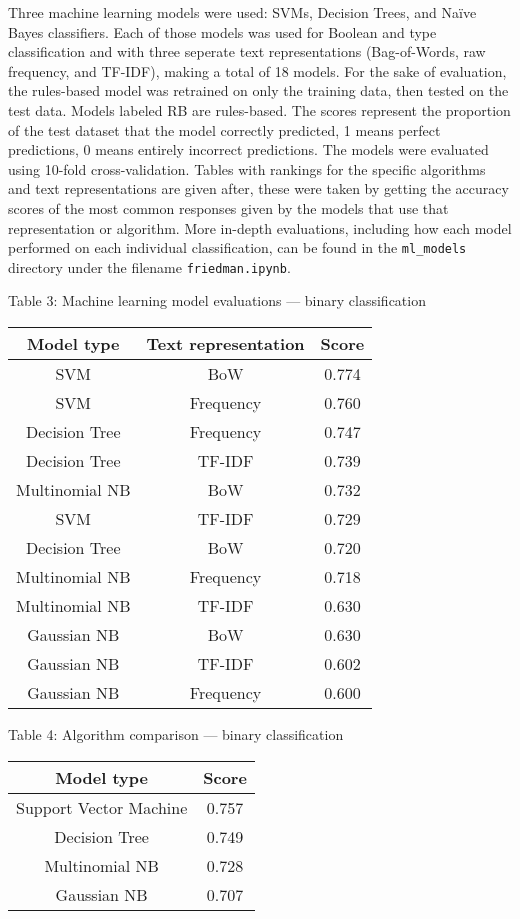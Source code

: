 \documentclass{article}
\begin{document}
Three machine learning models were used: SVMs, Decision Trees, and Naïve Bayes classifiers. Each of those models was used for Boolean and type classification and with three seperate text representations (Bag-of-Words, raw frequency, and TF-IDF), making a total of 18 models. For the sake of evaluation, the rules-based model was retrained on only the training data, then tested on the test data. Models labeled RB are rules-based. The scores represent the proportion of the test dataset that the model correctly predicted, 1 means perfect predictions, 0 means entirely incorrect predictions. The models were evaluated using 10-fold cross-validation. Tables with rankings for the specific algorithms and text representations are given after, these were taken by getting the accuracy scores of the most common responses given by the models that use that representation or algorithm. More in-depth evaluations, including how each model performed on each individual classification, can be found in the \texttt{ml\_models} directory under the filename \texttt{friedman.ipynb}.

\begin{center}
Table 3: Machine learning model evaluations --- binary classification
\begin{tabular}{ |c|c|c| }
\hline {\bf Model type} & {\bf Text representation} & {\bf Score}\\
\hline SVM & BoW & 0.774\\
\hline SVM & Frequency & 0.760\\
\hline Decision Tree & Frequency & 0.747\\
\hline Decision Tree & TF-IDF & 0.739\\
\hline Multinomial NB & BoW & 0.732\\
\hline SVM & TF-IDF & 0.729\\
\hline Decision Tree & BoW & 0.720\\
\hline Multinomial NB & Frequency & 0.718\\
\hline Multinomial NB & TF-IDF & 0.630\\
\hline Gaussian NB & BoW & 0.630\\
\hline Gaussian NB & TF-IDF & 0.602\\
\hline Gaussian NB & Frequency & 0.600\\
\hline
\end{tabular}
\end{center}

\begin{center}
Table 4: Algorithm comparison --- binary classification\\
\begin{tabular}{ |c|c| }
\hline {\bf Model type}& {\bf Score}\\
\hline Support Vector Machine & 0.757\\
\hline Decision Tree & 0.749\\
\hline Multinomial NB & 0.728\\
\hline Gaussian NB & 0.707\\
\hline
\end{tabular}
\end{center}
\end{document}
